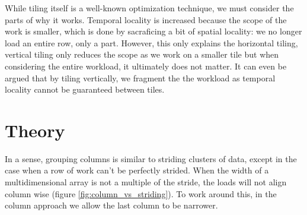 While tiling itself is a well-known optimization technique, we must consider the parts of why it works.
Temporal locality is increased because the scope of the work is smaller, which is done by sacraficing a bit of spatial locality: we no longer load an entire row, only a part.
However, this only explains the horizontal tiling, vertical tiling only reduces the scope as we work on a smaller tile but when considering the entire workload, it ultimately does not matter.
It can even be argued that by tiling vertically, we fragment the the workload as temporal locality cannot be guaranteed between tiles.

\section{Theory}
\label{sec:implementation_theory}

In a sense, grouping columns is similar to striding clusters of data, except in the case when a row of work can't be perfectly strided.
When the width of a multidimensional array is not a multiple of the stride, the loads will not align column wise (figure \ref{fig:column_vs_striding}).
To work around this, in the column approach we allow the last column to be narrower.

